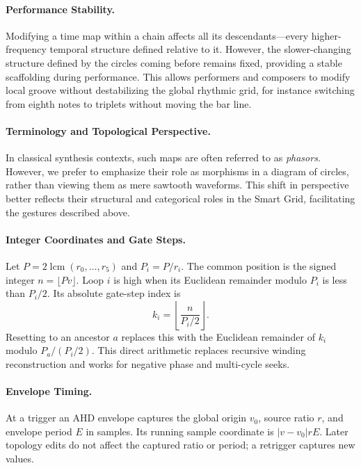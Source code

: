 \documentclass[12pt]{article}
\begin{document}
\paragraph{Performance Stability.}  
Modifying a time map within a chain affects all its descendants—every higher-frequency temporal structure defined relative to it.  
However, the slower-changing structure defined by the circles coming before remains fixed, providing a stable scaffolding during performance.  
This allows performers and composers to modify local groove without destabilizing the global rhythmic grid, for instance switching from eighth notes to triplets without moving the bar line.

\paragraph{Terminology and Topological Perspective.}  
In classical synthesis contexts, such maps are often referred to as \emph{phasors}.  
However, we prefer to emphasize their role as morphisms in a diagram of circles, rather than viewing them as mere sawtooth waveforms.  
This shift in perspective better reflects their structural and categorical roles in the Smart Grid, facilitating the gestures described above.

\paragraph{Integer Coordinates and Gate Steps.}
Let $P=2\operatorname{lcm}(r_0,\ldots,r_5)$ and $P_i=P/r_i$. The common position is the signed integer $n=\lfloor Pv\rfloor$. Loop $i$ is high when its Euclidean remainder modulo $P_i$ is less than $P_i/2$. Its absolute gate-step index is
\[
k_i=\left\lfloor\frac{n}{P_i/2}\right\rfloor.
\]
Resetting to an ancestor $a$ replaces this with the Euclidean remainder of $k_i$ modulo $P_a/(P_i/2)$. This direct arithmetic replaces recursive winding reconstruction and works for negative phase and multi-cycle seeks.

\paragraph{Envelope Timing.}
At a trigger an AHD envelope captures the global origin $v_0$, source ratio $r$, and envelope period $E$ in samples. Its running sample coordinate is $|v-v_0|rE$. Later topology edits do not affect the captured ratio or period; a retrigger captures new values.
\end{document}
